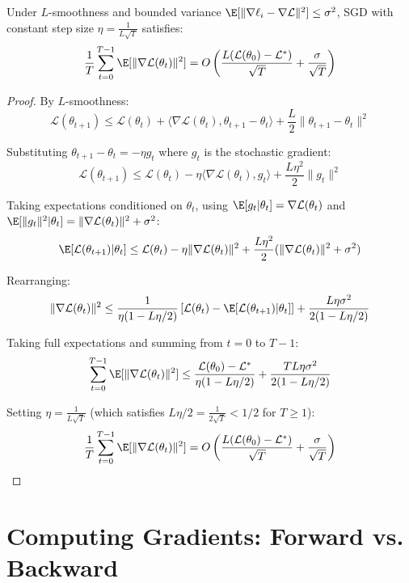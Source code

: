 \documentclass[main.tex]{subfiles}
\begin{document}
\begin{theorem}
Under $L$-smoothness and bounded variance $\E[\|\nabla \ell_i - \nabla \mathcal{L}\|^2] \leq \sigma^2$, SGD with constant step size $\eta = \frac{1}{L\sqrt{T}}$ satisfies:
$$\frac{1}{T}\sum_{t=0}^{T-1}\E[\|\nabla\mathcal{L}(\theta_t)\|^2] = O\left(\frac{L(\mathcal{L}(\theta_0) - \mathcal{L}^*)}{\sqrt{T}} + \frac{\sigma}{\sqrt{T}}\right)$$
\end{theorem}

\begin{proof}
By $L$-smoothness:
$$\mathcal{L}(\theta_{t+1}) \leq \mathcal{L}(\theta_t) + \langle \nabla\mathcal{L}(\theta_t), \theta_{t+1} - \theta_t \rangle + \frac{L}{2}\|\theta_{t+1} - \theta_t\|^2$$

Substituting $\theta_{t+1} - \theta_t = -\eta g_t$ where $g_t$ is the stochastic gradient:
$$\mathcal{L}(\theta_{t+1}) \leq \mathcal{L}(\theta_t) - \eta\langle \nabla\mathcal{L}(\theta_t), g_t \rangle + \frac{L\eta^2}{2}\|g_t\|^2$$

Taking expectations conditioned on $\theta_t$, using $\E[g_t | \theta_t] = \nabla\mathcal{L}(\theta_t)$ and $\E[\|g_t\|^2 | \theta_t] = \|\nabla\mathcal{L}(\theta_t)\|^2 + \sigma^2$:
$$\E[\mathcal{L}(\theta_{t+1}) | \theta_t] \leq \mathcal{L}(\theta_t) - \eta\|\nabla\mathcal{L}(\theta_t)\|^2 + \frac{L\eta^2}{2}(\|\nabla\mathcal{L}(\theta_t)\|^2 + \sigma^2)$$

Rearranging:
$$\|\nabla\mathcal{L}(\theta_t)\|^2 \leq \frac{1}{\eta(1 - L\eta/2)}\left[\mathcal{L}(\theta_t) - \E[\mathcal{L}(\theta_{t+1}) | \theta_t]\right] + \frac{L\eta\sigma^2}{2(1 - L\eta/2)}$$

Taking full expectations and summing from $t = 0$ to $T-1$:
$$\sum_{t=0}^{T-1} \E[\|\nabla\mathcal{L}(\theta_t)\|^2] \leq \frac{\mathcal{L}(\theta_0) - \mathcal{L}^*}{\eta(1 - L\eta/2)} + \frac{TL\eta\sigma^2}{2(1 - L\eta/2)}$$

Setting $\eta = \frac{1}{L\sqrt{T}}$ (which satisfies $L\eta/2 = \frac{1}{2\sqrt{T}} < 1/2$ for $T \geq 1$):
$$\frac{1}{T}\sum_{t=0}^{T-1} \E[\|\nabla\mathcal{L}(\theta_t)\|^2] = O\left(\frac{L(\mathcal{L}(\theta_0) - \mathcal{L}^*)}{\sqrt{T}} + \frac{\sigma}{\sqrt{T}}\right)$$
\end{proof}

\needspace{0.33\textheight}
\section{Computing Gradients: Forward vs. Backward}
\end{document}
